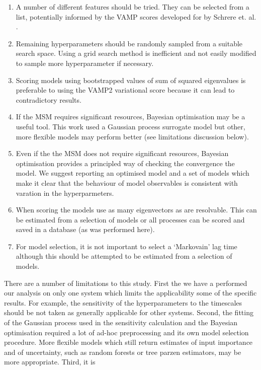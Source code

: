 \documentclass[journal=jacsat,manuscript=article]{achemso}
\begin{document}
\begin{enumerate}
    \item A number of different features should be tried. They can be selected from a list, potentially informed by the VAMP scores developed for by Schrere et. al. \cite{scherer_variational_2019}. 
    \item Remaining hyperparameters should be randomly sampled from a suitable search space. Using a grid search method is inefficient and not easily modified to sample more hyperparameter if necessary. 
    \item Scoring models using bootstrapped values of sum of squared eigenvalues is preferable to using the VAMP2 variational score because it can lead to contradictory results. 
    \item If the MSM requires significant resources, Bayesian optimisation may be a useful tool.  This work used a Gaussian process surrogate model but other, more flexible models may perform better (see limitations discussion below). 
    \item Even if the the MSM does not require significant resources, Bayesian optimisation provides a principled way of checking the convergence the model.  We suggest reporting an optimised model and a set of models which make it clear that the behaviour of model observables is consistent with varation in the hyperparmeters. 
    \item When scoring the models use as many eigenvectors as are resolvable. This can be estimated from a selection of models or all processes can be scored and saved in a database (as was performed here).  
    \item For model selection, it is not important to select a `Markovain' lag time although this should be attempted to be estimated from a selection of models.  
\end{enumerate}

There are a number of limitations to this study.  First the we have a performed our analysis on only one system which limits the applicability some of the specific results. For example, the sensitivity of the hyperparameters to the timescales should be not taken as generally applicable for other systems. Second, the fitting of the Gaussian process used in the sensitivity calculation and the Bayesian optimisation required a lot of ad-hoc preprocessing and its own model selection procedure.  More flexible models which still return estimates of input importance and of uncertainty, such as random forests or tree parzen estimators, may be more appropriate.  Third, it is 
\end{document}
